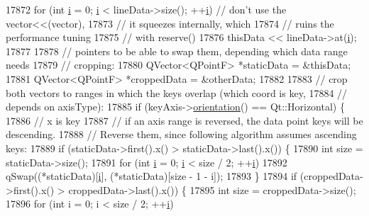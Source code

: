\begin{DoxyCode}
17872   \textcolor{keywordflow}{for} (\textcolor{keywordtype}{int} \hyperlink{_comparision_pictures_2_createtest_image_8m_a6f6ccfcf58b31cb6412107d9d5281426}{i} = 0; \hyperlink{_comparision_pictures_2_createtest_image_8m_a6f6ccfcf58b31cb6412107d9d5281426}{i} < lineData->size(); ++\hyperlink{_comparision_pictures_2_createtest_image_8m_a6f6ccfcf58b31cb6412107d9d5281426}{i}) \textcolor{comment}{// don't use the vector<<(vector),}
17873                                              \textcolor{comment}{// it squeezes internally, which}
17874                                              \textcolor{comment}{// ruins the performance tuning}
17875                                              \textcolor{comment}{// with reserve()}
17876     thisData << lineData->at(\hyperlink{_comparision_pictures_2_createtest_image_8m_a6f6ccfcf58b31cb6412107d9d5281426}{i});
17877 
17878   \textcolor{comment}{// pointers to be able to swap them, depending which data range needs}
17879   \textcolor{comment}{// cropping:}
17880   QVector<QPointF> *staticData = &thisData;
17881   QVector<QPointF> *croppedData = &otherData;
17882 
17883   \textcolor{comment}{// crop both vectors to ranges in which the keys overlap (which coord is key,}
17884   \textcolor{comment}{// depends on axisType):}
17885   \textcolor{keywordflow}{if} (keyAxis->\hyperlink{class_q_c_p_axis_a57483f2f60145ddc9e63f3af53959265}{orientation}() == Qt::Horizontal) \{
17886     \textcolor{comment}{// x is key}
17887     \textcolor{comment}{// if an axis range is reversed, the data point keys will be descending.}
17888     \textcolor{comment}{// Reverse them, since following algorithm assumes ascending keys:}
17889     \textcolor{keywordflow}{if} (staticData->first().x() > staticData->last().x()) \{
17890       \textcolor{keywordtype}{int} size = staticData->size();
17891       \textcolor{keywordflow}{for} (\textcolor{keywordtype}{int} \hyperlink{_comparision_pictures_2_createtest_image_8m_a6f6ccfcf58b31cb6412107d9d5281426}{i} = 0; \hyperlink{_comparision_pictures_2_createtest_image_8m_a6f6ccfcf58b31cb6412107d9d5281426}{i} < size / 2; ++\hyperlink{_comparision_pictures_2_createtest_image_8m_a6f6ccfcf58b31cb6412107d9d5281426}{i})
17892         qSwap((*staticData)[\hyperlink{_comparision_pictures_2_createtest_image_8m_a6f6ccfcf58b31cb6412107d9d5281426}{i}], (*staticData)[size - 1 - i]);
17893     \}
17894     \textcolor{keywordflow}{if} (croppedData->first().x() > croppedData->last().x()) \{
17895       \textcolor{keywordtype}{int} size = croppedData->size();
17896       \textcolor{keywordflow}{for} (\textcolor{keywordtype}{int} i = 0; i < size / 2; ++\hyperlink{_comparision_pictures_2_createtest_image_8m_a6f6ccfcf58b31cb6412107d9d5281426}{i})

\end{DoxyCode}
